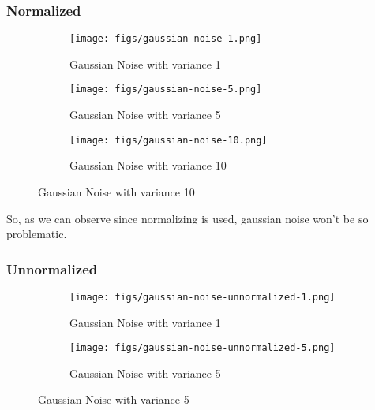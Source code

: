 \documentclass[12pt]{article}
\begin{document}
\subsubsection{Normalized}
\begin{figure}[H]
    \centering
    \begin{subfigure}{\textwidth}
        \texttt{[image: figs/gaussian-noise-1.png]}
        \caption{Gaussian Noise with variance 1}
        \label{fig:gaussian-1}
    \end{subfigure}
    
    \begin{subfigure}{\textwidth}
        \texttt{[image: figs/gaussian-noise-5.png]}
        \caption{Gaussian Noise with variance 5}
        \label{fig:gaussian-5}
    \end{subfigure}
    
    \begin{subfigure}{\textwidth}
        \texttt{[image: figs/gaussian-noise-10.png]}
        \caption{Gaussian Noise with variance 10}
        \label{fig:gaussian-10}
    \end{subfigure}
\end{figure}

So, as we can observe since normalizing is used, gaussian noise won't be so problematic.

\subsubsection{Unnormalized}
\begin{figure}[H]
    \centering
    \begin{subfigure}{\textwidth}
        \texttt{[image: figs/gaussian-noise-unnormalized-1.png]}
        \caption{Gaussian Noise with variance 1}
        \label{fig:gaussian-unnormalized-1}
    \end{subfigure}
    
    \begin{subfigure}{\textwidth}
        \texttt{[image: figs/gaussian-noise-unnormalized-5.png]}
        \caption{Gaussian Noise with variance 5}
        \label{fig:gaussian-unnormalized-5}
    \end{subfigure}
\end{figure}
\end{document}
